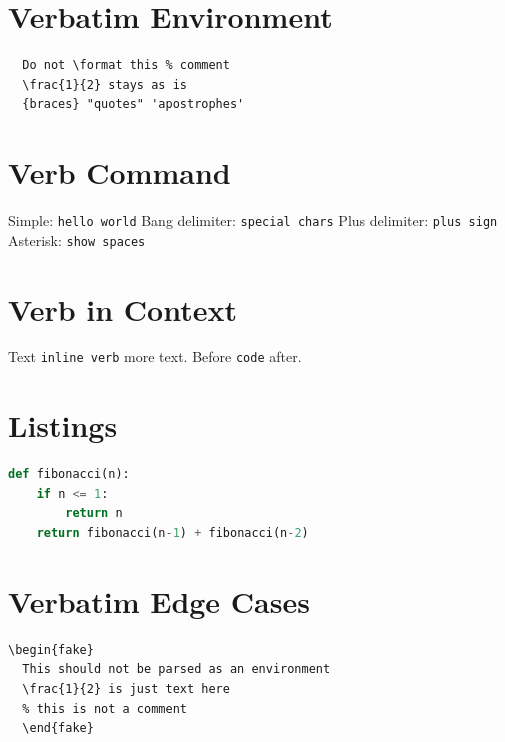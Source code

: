 \documentclass{article}
\begin{document}
\section{Verbatim Environment}
\begin{verbatim}
  Do not \format this % comment
  \frac{1}{2} stays as is
  {braces} "quotes" 'apostrophes'
\end{verbatim}

\section{Verb Command}
Simple: \verb|hello world|
Bang delimiter: \verb!special chars!
Plus delimiter: \verb+plus sign+
Asterisk: \verb*|show spaces|

\section{Verb in Context}
Text \verb|inline verb| more text.
Before \verb|code| after.

\section{Listings}
\begin{lstlisting}[language=Python]
def fibonacci(n):
    if n <= 1:
        return n
    return fibonacci(n-1) + fibonacci(n-2)
\end{lstlisting}

\section{Verbatim Edge Cases}
\begin{verbatim}
\begin{fake}
  This should not be parsed as an environment
  \frac{1}{2} is just text here
  % this is not a comment
  \end{fake}
\end{verbatim}
\end{document}
